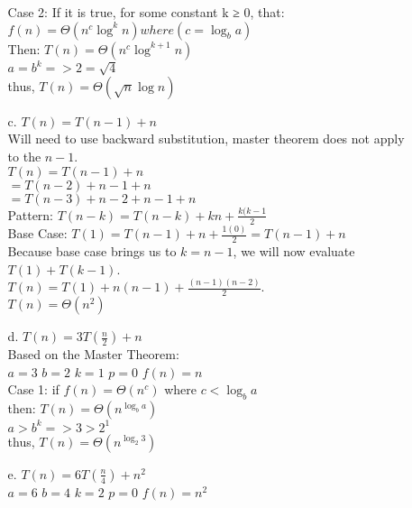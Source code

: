 \documentclass[10pt]{article}
\begin{document}
\begin{enumerate}
\begin{enumerate}
Case 2: If it is true, for some constant k ≥ 0, that:
$f(n) = \Theta(n^{c}\log^{k}n) where  (c =  \log_ba)$ \\
Then: $T(n) = \Theta(n^{c}\log^{k+1}n)$ \\

$a = b^{k} => 2 = \sqrt{4}$ \\
thus, $T(n) = \Theta(\sqrt{n} \log n)$

\vspace{.75in}

\item[c.] $T(n) = T(n - 1) +  n$\\

Will need to use backward substitution, master theorem does not apply to the $n - 1$.  \\

$T(n) = T(n - 1) + n$\\
$= T(n - 2) + n - 1 + n$ \\
$= T(n - 3) + n - 2 + n - 1 + n$\\
Pattern: $T(n - k) = T(n - k) + kn + \frac{k(k-1}{2}$\\
Base Case: $T(1) = T(n - 1) + n + \frac{1(0)}{2} = T(n - 1) + n$ \\
Because base case brings us to $k = n - 1$, we will now evaluate $T(1) + T(k - 1)$. \\
$T(n) = T(1) + n(n - 1) + \frac{(n - 1)(n - 2)}{2}$.\\
$T(n) = \Theta(n^2)$

\vspace{.75in}

\item[d.] $T(n) = 3T(\frac{n}{2}) + n$\\
Based on the Master Theorem: \\
$a = 3$
$b = 2$
$k = 1$
$p = 0$
$f(n) = n$ \\

Case 1: if $f(n) = \Theta(n^{c})$ where $c < \log_ba$\\
then: $T(n) = \Theta(n^{\log_ba})$\\

$ a > b^{k} => 3 > 2^1$\\
thus, $T(n) = \Theta(n^{\log_2 3})$

\vspace{.75in}

\item[e.] $T(n) = 6T(\frac{n}{4}) + n^2$\\
$a = 6$
$b = 4$
$k = 2$
$p = 0$
$f(n) = n^2$ \\


\end{enumerate}
\end{enumerate}
\end{document}
